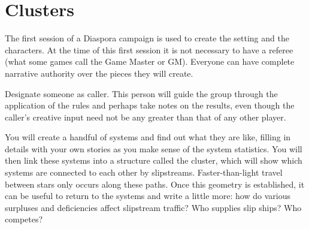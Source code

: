 \chapter{Clusters}
\label{sec:clusters}

The first session of a Diaspora campaign is used to create the setting and the characters. At the time of this first session it is not necessary to have a referee (what some games call the Game Master or GM).  Everyone can have complete narrative authority over the pieces they will create.

Designate someone as caller. This person will guide the group through the application of the rules and perhaps take notes on the results, even though the caller's creative input need not be any greater than that of any other player.

You will create a handful of systems and find out what they are like, filling in details with your own stories as you make sense of the system statistics.
%
You will then link these systems into a structure called the clus\-ter, which will show which systems are connected to each other by slipstreams. Faster-than-light travel between stars only occurs along these paths. Once this geometry is established, it can be useful to return to the systems and write a little more: how do various surpluses and deficiencies affect slipstream traffic? Who supplies slip ships? Who com\-petes?









